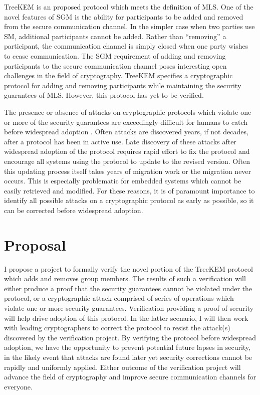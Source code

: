 \documentclass[12pt,twocolumn]{article}
\begin{document}
	TreeKEM \cite{bhargavan:hal-02425247} is an proposed protocol which meets the definition of MLS.
	One of the novel features of SGM is the ability for participants to be added and removed from the secure communication channel.
	In the simpler case when two parties use SM, additional participants cannot be added. Rather than ``removing'' a participant, the communication channel is simply closed when one party wishes to cease communication.
	The SGM requirement of adding and removing participants to the secure communication channel poses interesting open challenges in the field of cryptography.
	TreeKEM specifies a cryptographic protocol for adding and removing participants while maintaining the security guarantees of MLS.
	However, this protocol has yet to be verified.
	
	The presence or absence of attacks on cryptographic protocols which violate one or more of the security guarantees are exceedingly difficult for humans to catch before widespread adoption \cite{clark1997survey}.
	Often attacks are discovered years, if not decades, after a protocol has been in active use.
	Late discovery of these attacks after widespread adoption of the protocol requires rapid effort to fix the protocol and encourage all systems using the protocol to update to the revised version.
	Often this updating process itself takes years of migration work or the migration never occurs.
	This is especially problematic for embedded systems which cannot be easily retrieved and modified.
	For these reasons, it is of paramount importance to identify all possible attacks on a cryptographic protocol as early as possible, so it can be corrected before widespread adoption.
	
	
	\section*{Proposal}
	
	I propose a project to formally verify the novel portion of the TreeKEM protocol which adds and removes group members.
	The results of such a verification will either produce a proof that the security guarantees cannot be violated under the protocol, or a cryptographic attack comprised of series of operations which violate one or more security guarantees.
	Verification providing a proof of security will help drive adoption of this protocol.
	In the latter scenario, I will then work with leading cryptographers to correct the protocol to resist the attack(s) discovered by the verification project.
	By verifying the protocol before widespread adoption, we have the opportunity to prevent potential future lapses in security, in the likely event that attacks are found later yet security corrections cannot be rapidly and uniformly applied.
	Either outcome of the verification project will advance the field of cryptography and improve secure communication channels for everyone.
	
\end{document}
